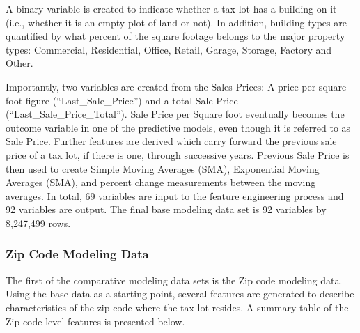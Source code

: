 \documentclass[12pt,]{article}
\begin{document}
A binary variable is created to indicate whether a tax lot has a
building on it (i.e., whether it is an empty plot of land or not). In
addition, building types are quantified by what percent of the square
footage belongs to the major property types: Commercial, Residential,
Office, Retail, Garage, Storage, Factory and Other.

Importantly, two variables are created from the Sales Prices: A
price-per-square-foot figure (``Last\_Sale\_Price'') and a total Sale
Price (``Last\_Sale\_Price\_Total''). Sale Price per Square foot
eventually becomes the outcome variable in one of the predictive models,
even though it is referred to as Sale Price. Further features are
derived which carry forward the previous sale price of a tax lot, if
there is one, through successive years. Previous Sale Price is then used
to create Simple Moving Averages (SMA), Exponential Moving Averages
(SMA), and percent change measurements between the moving averages. In
total, 69 variables are input to the feature engineering process and 92
variables are output. The final base modeling data set is 92 variables
by 8,247,499 rows.

\hypertarget{zip-code-modeling-data}{%
\subsubsection{Zip Code Modeling Data}\label{zip-code-modeling-data}}

The first of the comparative modeling data sets is the Zip code modeling
data. Using the base data as a starting point, several features are
generated to describe characteristics of the zip code where the tax lot
resides. A summary table of the Zip code level features is presented
below.
\end{document}
